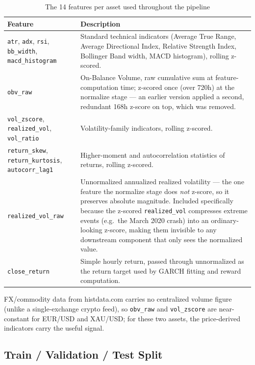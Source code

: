 \begin{table}[H]
\centering
\small
\caption{The 14 features per asset used throughout the pipeline}
\label{tab:features}
\begin{tabular}{|>{\raggedright\arraybackslash}p{4.4cm}|p{9.6cm}|}
\hline
\textbf{Feature} & \textbf{Description} \\
\hline
\texttt{atr}, \texttt{adx}, \texttt{rsi}, \texttt{bb\_width}, \texttt{macd\_histogram} & Standard technical indicators (Average True Range, Average Directional Index, Relative Strength Index, Bollinger Band width, MACD histogram), rolling z-scored. \\
\hline
\texttt{obv\_raw} & On-Balance Volume, raw cumulative sum at feature-computation time; z-scored once (over 720h) at the normalize stage --- an earlier version applied a second, redundant 168h z-score on top, which was removed. \\
\hline
\texttt{vol\_zscore}, \texttt{realized\_vol}, \texttt{vol\_ratio} & Volatility-family indicators, rolling z-scored. \\
\hline
\texttt{return\_skew}, \texttt{return\_kurtosis}, \texttt{autocorr\_lag1} & Higher-moment and autocorrelation statistics of returns, rolling z-scored. \\
\hline
\texttt{realized\_vol\_raw} & Unnormalized annualized realized volatility --- the one feature the normalize stage does \emph{not} z-score, so it preserves absolute magnitude. Included specifically because the z-scored \texttt{realized\_vol} compresses extreme events (e.g.\ the March 2020 crash) into an ordinary-looking z-score, making them invisible to any downstream component that only sees the normalized value. \\
\hline
\texttt{close\_return} & Simple hourly return, passed through unnormalized as the return target used by GARCH fitting and reward computation. \\
\hline
\end{tabular}
\normalsize
\end{table}

FX/commodity data from histdata.com carries no centralized volume figure (unlike a single-exchange crypto feed), so \texttt{obv\_raw} and \texttt{vol\_zscore} are near-constant for EUR/USD and XAU/USD; for these two assets, the price-derived indicators carry the useful signal.

\subsection{Train / Validation / Test Split}
\label{subsec:train-val-test-split}

